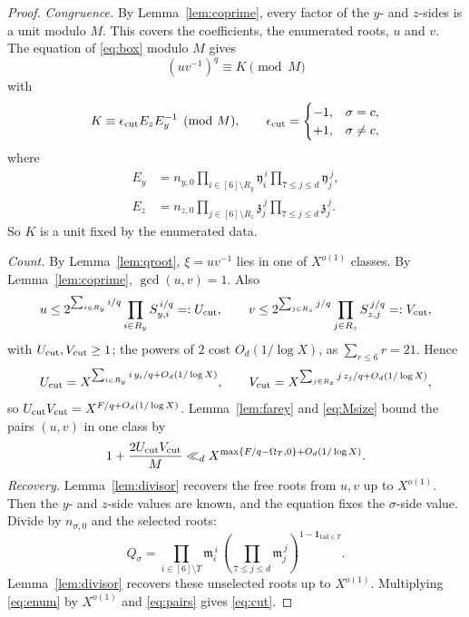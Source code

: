 \documentclass{amsart}
\theoremstyle{definition}
\theoremstyle{plain}
\numberwithin{equation}{section}
\numberwithin{table}{section}
\newcommand{\pos}[1]{\max\{#1,0\}}
\begin{document}
\begin{proof}
\emph{Congruence.} By Lemma~\ref{lem:coprime}, every factor of the
$y$- and $z$-sides is a unit modulo $M$. This covers the coefficients, the
enumerated roots, $u$ and $v$. The equation of
\eqref{eq:box} modulo $M$ gives
\begin{equation}\label{eq:congr}
 (uv^{-1})^{q}\equiv K\pmod M
\end{equation}
with
\begin{equation}\label{eq:Ksign}
 K\equiv\epsilon_{\rm cut} E_zE_y^{-1}\pmod M,\qquad
 \epsilon_{\rm cut}=\begin{cases}-1,&\sigma=c,\\+1,&\sigma\ne c,\end{cases}
\end{equation}
where
\[
\begin{aligned}
 E_y&=n_{y,0}\prod_{i\in[6]\setminus R_y}\mathfrak y_i^{\,i}
 \prod_{7\le j\le d}\mathfrak y_j^{\,j},\\
 E_z&=n_{z,0}\prod_{j\in[6]\setminus R_z}\mathfrak z_j^{\,j}
 \prod_{7\le j\le d}\mathfrak z_j^{\,j}.
\end{aligned}
\]
So $K$ is a unit fixed by the enumerated data.

\emph{Count.} By Lemma~\ref{lem:qroot}, $\xi=uv^{-1}$ lies in one of
$X^{o(1)}$ classes. By Lemma~\ref{lem:coprime}, $\gcd(u,v)=1$. Also
\[
 u\le2^{\sum_{i\in R_y}i/q}\prod_{i\in R_y}S_{y,i}^{\,i/q}=:U_{\rm cut},
 \qquad
 v\le2^{\sum_{j\in R_z}j/q}\prod_{j\in R_z}S_{z,j}^{\,j/q}=:V_{\rm cut},
\]
with $U_{\rm cut},V_{\rm cut}\ge1$; the powers of $2$ cost $O_d(1/\log X)$, as
$\sum_{r\le6}r=21$. Hence
\[
 U_{\rm cut}=X^{\sum_{i\in R_y}i\,y_i/q+O_d(1/\log X)},
 \qquad
 V_{\rm cut}=X^{\sum_{j\in R_z}j\,z_j/q+O_d(1/\log X)},
\]
so $U_{\rm cut}V_{\rm cut}=X^{F/q+O_d(1/\log X)}$.
Lemma~\ref{lem:farey} and \eqref{eq:Msize} bound the pairs $(u,v)$ in one
class by
\begin{equation}\label{eq:pairs}
 1+\frac{2U_{\rm cut}V_{\rm cut}}{M}\ll_dX^{\pos{F/q-\Omega_T}+O_d(1/\log X)} .
\end{equation}
\emph{Recovery.} Lemma~\ref{lem:divisor} recovers the free roots from $u,v$ up
to $X^{o(1)}$. Then the $y$- and $z$-side values are known, and the equation fixes
the $\sigma$-side value. Divide by $n_{\sigma,0}$ and the selected roots:
\[
 Q_\sigma=\prod_{i\in[6]\setminus T}\mathfrak m_i^{\,i}\,
 \left(\prod_{7\le j\le d}\mathfrak m_j^{\,j}\right)^{1-\mathbf 1_{\mathrm{tail}\in T}}.
\]
Lemma~\ref{lem:divisor} recovers these unselected roots up to $X^{o(1)}$.
Multiplying \eqref{eq:enum} by $X^{o(1)}$ and \eqref{eq:pairs} gives
\eqref{eq:cut}.
\end{proof}
\end{document}

